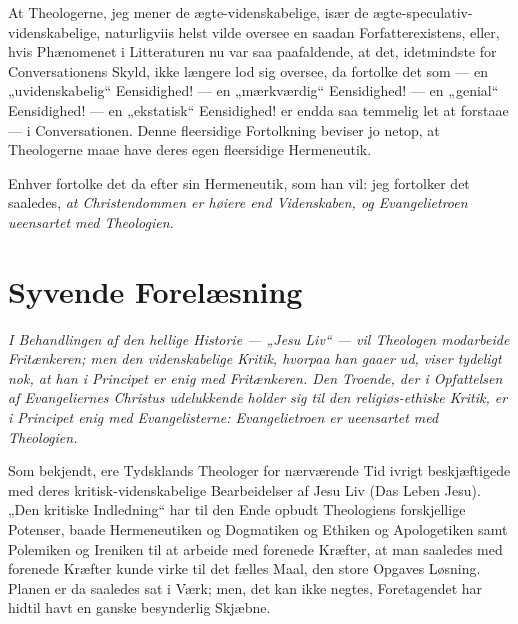 \documentclass[12pt,a4paper]{book}
\newcommand{\opage}[1]{\marginnote{\footnotesize\textit{[#1]}}}
\begin{document}
\opage{80} At Theologerne, jeg mener de ægte-videnskabelige, især de
ægte-speculativ-videnskabelige, naturligviis helst vilde oversee en saadan
Forfatterexistens, eller, hvis Phænomenet i Litteraturen nu var saa
paafaldende, at det, idetmindste for Conversationens Skyld, ikke længere lod
sig oversee, da fortolke det som --- en „uvidenskabelig“ Eensidighed! --- en
„mærkværdig“ Eensidighed! --- en „genial“ Eensidighed! --- en „ekstatisk“
Eensidighed! er endda saa temmelig let at forstaae --- i Conversationen.
Denne fleersidige Fortolkning beviser jo netop, at Theologerne maae have
deres egen fleersidige Hermeneutik.

Enhver fortolke det da efter sin Hermeneutik, som han vil: jeg fortolker det
saaledes, \emph{at Christendommen er høiere end Videnskaben, og
Evangelietroen ueensartet med Theologien.}

\chapter*{Syvende Forelæsning}
\label{ch:forel7}

\begin{center}\itshape
I Behandlingen af den hellige Historie --- „Jesu Liv“ --- vil Theologen
modarbeide Fritænkeren; men den videnskabelige Kritik, hvorpaa han gaaer
ud, viser tydeligt nok, at han i Principet er enig med Fritænkeren. Den
Troende, der i Opfattelsen af Evangeliernes Christus udelukkende holder
sig til den religiøs-ethiske Kritik, er i Principet enig med
Evangelisterne: Evangelietroen er ueensartet med Theologien.
\end{center}

\opage{81} Som bekjendt, ere Tydsklands Theologer for nærværende Tid ivrigt
beskjæftigede med deres kritisk-videnskabelige Bearbeidelser af Jesu Liv
(Das Leben Jesu). „Den kritiske Indledning“ har til den Ende opbudt
Theologiens forskjellige Potenser, baade Hermeneutiken og Dogmatiken og
Ethiken og Apologetiken samt Polemiken og Ireniken til at arbeide med
forenede Kræfter, at man saaledes med forenede Kræfter kunde virke til
det fælles Maal, den store Opgaves Løsning. Planen er da saaledes sat i
Værk; men, det kan ikke negtes, Foretagendet har hidtil havt en ganske
besynderlig Skjæbne.
\end{document}
